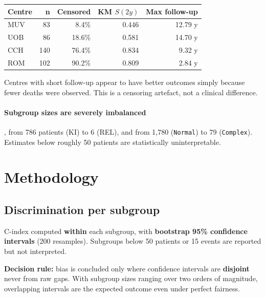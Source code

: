\documentclass[11pt,a4paper]{article}
\newcommand{\var}[1]{\texttt{#1}}                      %
\begin{document}
\begin{table}[h]
\centering
\begin{tabular}{@{}lrrrr@{}}
\toprule
\textbf{Centre} & \textbf{n} & \textbf{Censored} & \textbf{KM $S(2y)$} & \textbf{Max follow-up} \\
\midrule
MUV  &  83 &  8.4\% & 0.446 & 12.79 y \\
UOB  &  86 & 18.6\% & 0.581 & 14.70 y \\
CCH  & 140 & 76.4\% & 0.834 &  9.32 y \\
ROM  & 102 & 90.2\% & 0.809 &  2.84 y \\
\bottomrule
\end{tabular}
\end{table}

Centres with short follow-up appear to have better outcomes simply because fewer deaths were
observed. This is a censoring artefact, not a clinical difference.

\paragraph{Subgroup sizes are severely imbalanced}, from 786 patients (KI) to 6 (REL), and from
1{,}780 (\var{Normal}) to 79 (\var{Complex}). Estimates below roughly 50 patients are
statistically uninterpretable.

\section{Methodology}

\subsection{Discrimination per subgroup}

C-index computed \textbf{within} each subgroup, with \textbf{bootstrap 95\% confidence
intervals} (200 resamples). Subgroups below 50 patients or 15 events are reported but not
interpreted.

\begin{keybox}
\textbf{Decision rule:} bias is concluded only where confidence intervals are
\textbf{disjoint} never from raw gaps. With subgroup sizes ranging over two orders of
magnitude, overlapping intervals are the expected outcome even under perfect fairness.
\end{keybox}
\end{document}
